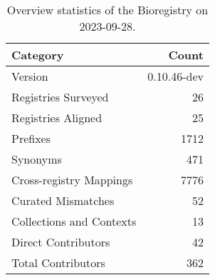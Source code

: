 \begin{table}
\caption{Overview statistics of the Bioregistry on 2023-09-28.}
\label{tab:bioregistry-summary}
\begin{tabular}{lr}
\toprule
Category & Count \\
\midrule
Version & 0.10.46-dev \\
Registries Surveyed & 26 \\
Registries Aligned & 25 \\
Prefixes & 1712 \\
Synonyms & 471 \\
Cross-registry Mappings & 7776 \\
Curated Mismatches & 52 \\
Collections and Contexts & 13 \\
Direct Contributors & 42 \\
Total Contributors & 362 \\
\bottomrule
\end{tabular}
\end{table}
